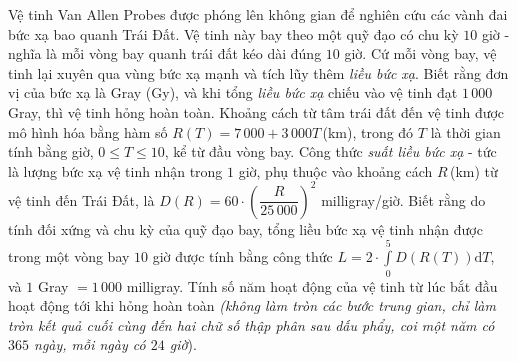 \begin{ex}%
	Vệ tinh Van Allen Probes được phóng lên không gian để nghiên cứu các vành đai bức xạ bao quanh Trái Đất. Vệ tinh này bay theo một quỹ đạo có chu kỳ $10$ giờ - nghĩa là mỗi vòng bay quanh trái đất kéo dài đúng $10$ giờ. Cứ mỗi vòng bay, vệ tinh lại xuyên qua vùng bức xạ mạnh và tích lũy thêm {\it liều bức xạ}. Biết rằng đơn vị của bức xạ là Gray (Gy), và khi tổng {\it liều bức xạ} chiếu vào vệ tinh đạt $1\,000$ Gray, thì vệ tinh hỏng hoàn toàn. Khoảng cách từ tâm trái đất đến vệ tinh được mô hình hóa bằng hàm số $R (T) = 7\,000 + 3\,000T$\,(km), trong đó $T$ là thời gian tính bằng giờ, $0 \leq T \leq 10$, kể từ đầu vòng bay. Công thức {\it suất liều bức xạ} - tức là lượng bức xạ vệ tinh nhận trong $1$ giờ, phụ thuộc vào khoảng cách $R$\,(km) từ vệ tinh đến Trái Đất, là $D (R) = 60 \cdot \left(\dfrac{R}{25\,000}\right)^2$ milligray/giờ. Biết rằng do tính đối xứng và chu kỳ của quỹ đạo bay, tổng liều bức xạ vệ tinh nhận được trong một vòng bay $10$ giờ được tính bằng công thức $L = 2 \cdot \displaystyle \int\limits_{0}^{5} D (R(T)) \mathrm{d}T$, và $1$ Gray $=1\,000$ milligray. Tính số năm hoạt động của vệ tinh từ lúc bắt đầu hoạt động tới khi hỏng hoàn toàn \textit{(không làm tròn các bước trung gian, chỉ làm tròn kết quả cuối cùng đến hai chữ số thập phân sau dấu phẩy, coi một năm có $365$ ngày, mỗi ngày có $24$ giờ}). 
	\par {}
\end{ex}

